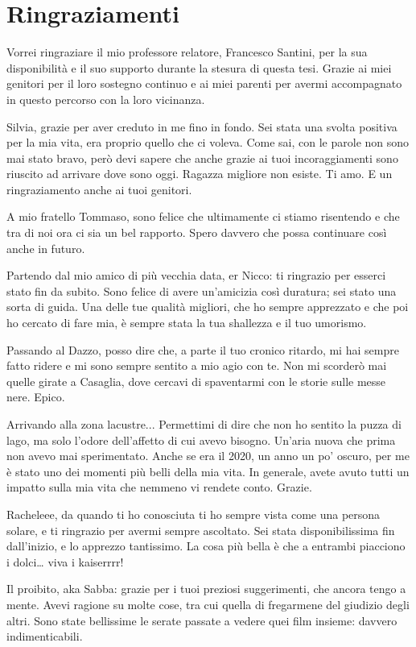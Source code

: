 \chapter*{Ringraziamenti}

Vorrei ringraziare il mio professore relatore, 
Francesco Santini, per la sua disponibilità e 
il suo supporto durante la stesura di questa tesi. 
Grazie ai miei genitori per il loro sostegno continuo e
ai miei parenti per avermi accompagnato 
in questo percorso con la loro vicinanza.

Silvia,
grazie per aver creduto in me fino in fondo. Sei stata una svolta positiva per la mia vita, era proprio quello che ci voleva.
Come sai, con le parole non sono mai stato bravo, però devi sapere che anche grazie ai tuoi incoraggiamenti sono riuscito ad arrivare dove sono oggi.
Ragazza migliore non esiste. Ti amo.
E un ringraziamento anche ai tuoi genitori.

A mio fratello Tommaso, sono felice che ultimamente ci stiamo risentendo e che tra di noi ora ci sia 
un bel rapporto. Spero davvero che possa continuare così anche in futuro.

Partendo dal mio amico di più vecchia data, er Nicco:
ti ringrazio per esserci stato fin da subito. Sono felice di avere un’amicizia così duratura; sei stato una sorta di guida.
Una delle tue qualità migliori, che ho sempre apprezzato e che poi ho cercato di fare mia, è sempre stata la tua shallezza e il tuo umorismo.

Passando al Dazzo, posso dire che, a parte il tuo cronico ritardo,
mi hai sempre fatto ridere e mi sono sempre sentito a mio agio con te.
Non mi scorderò mai quelle girate a Casaglia, dove cercavi di spaventarmi con le storie sulle messe nere. Epico.

Arrivando alla zona lacustre...
Permettimi di dire che non ho sentito la puzza di lago, ma solo l’odore dell’affetto di cui avevo bisogno.
Un’aria nuova che prima non avevo mai sperimentato.
Anche se era il 2020, un anno un po’ oscuro, per me è stato uno dei momenti più belli della mia vita.
In generale, avete avuto tutti un impatto sulla mia vita che nemmeno vi rendete conto. Grazie.

Racheleee,
da quando ti ho conosciuta ti ho sempre vista come una persona solare, e ti ringrazio per avermi sempre ascoltato.
Sei stata disponibilissima fin dall’inizio, e lo apprezzo tantissimo.
La cosa più bella è che a entrambi piacciono i dolci… viva i kaiserrrr!

Il proibito, aka Sabba:
grazie per i tuoi preziosi suggerimenti, che ancora tengo a mente.
Avevi ragione su molte cose, tra cui quella di fregarmene del giudizio degli altri.
Sono state bellissime le serate passate a vedere quei film insieme: davvero indimenticabili.

